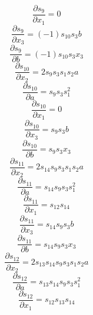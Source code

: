 \documentclass[10pt,a4paper]{article}
\begin{document}
\begin{dmath*}\frac{\partial s_{9}}{\partial x_{1}} = 0\end{dmath*}
\begin{dmath*}\frac{\partial s_{9}}{\partial x_{3}} = \left(-1\right)  s_{10}  s_{3}  b\end{dmath*}
\begin{dmath*}\frac{\partial s_{9}}{\partial b} = \left(-1\right)  s_{10}  s_{3}  x_{3}\end{dmath*}
\begin{dmath*}\frac{\partial s_{10}}{\partial x_{2}} = 2  s_{9}  s_{3}  s_{1}  s_{2}  a\end{dmath*}
\begin{dmath*}\frac{\partial s_{10}}{\partial a} = s_{9}  s_{3}  s_{1} ^ {2}\end{dmath*}
\begin{dmath*}\frac{\partial s_{10}}{\partial x_{1}} = 0\end{dmath*}
\begin{dmath*}\frac{\partial s_{10}}{\partial x_{3}} = s_{9}  s_{3}  b\end{dmath*}
\begin{dmath*}\frac{\partial s_{10}}{\partial b} = s_{9}  s_{3}  x_{3}\end{dmath*}
\begin{dmath*}\frac{\partial s_{11}}{\partial x_{2}} = 2  s_{14}  s_{9}  s_{3}  s_{1}  s_{2}  a\end{dmath*}
\begin{dmath*}\frac{\partial s_{11}}{\partial a} = s_{14}  s_{9}  s_{3}  s_{1} ^ {2}\end{dmath*}
\begin{dmath*}\frac{\partial s_{11}}{\partial x_{1}} = s_{12}  s_{14}\end{dmath*}
\begin{dmath*}\frac{\partial s_{11}}{\partial x_{3}} = s_{14}  s_{9}  s_{3}  b\end{dmath*}
\begin{dmath*}\frac{\partial s_{11}}{\partial b} = s_{14}  s_{9}  s_{3}  x_{3}\end{dmath*}
\begin{dmath*}\frac{\partial s_{12}}{\partial x_{2}} = 2  s_{13}  s_{14}  s_{9}  s_{3}  s_{1}  s_{2}  a\end{dmath*}
\begin{dmath*}\frac{\partial s_{12}}{\partial a} = s_{13}  s_{14}  s_{9}  s_{3}  s_{1} ^ {2}\end{dmath*}
\begin{dmath*}\frac{\partial s_{12}}{\partial x_{1}} = s_{12}  s_{13}  s_{14}\end{dmath*}
\end{document}
